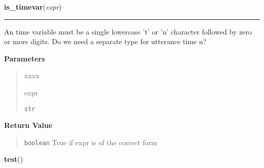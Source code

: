 \hspace{.8\funcindent}\begin{boxedminipage}{\funcwidth}

    \raggedright \textbf{is\_timevar}(\textit{expr})

    \vspace{-1.5ex}

    \rule{\textwidth}{0.5\fboxrule}
\setlength{\parskip}{2ex}
    An time variable must be a single lowercase 't' or 'n' character 
    followed by zero or more digits. Do we need a separate type for 
    utterance time n?

\setlength{\parskip}{1ex}
      \textbf{Parameters}
      \vspace{-1ex}

      \begin{quote}
        \begin{Ventry}{xxxx}

          \item[expr]

          \texttt{str}

        \end{Ventry}

      \end{quote}

      \textbf{Return Value}
    \vspace{-1ex}

      \begin{quote}
      \texttt{boolean} True if expr is of the correct form

      \end{quote}

    \end{boxedminipage}

    \label{temporaldrt:test}

    \vspace{0.5ex}

\hspace{.8\funcindent}\begin{boxedminipage}{\funcwidth}

    \raggedright \textbf{test}()

\setlength{\parskip}{2ex}
\setlength{\parskip}{1ex}
    \end{boxedminipage}

    \label{temporaldrt:test_2}

